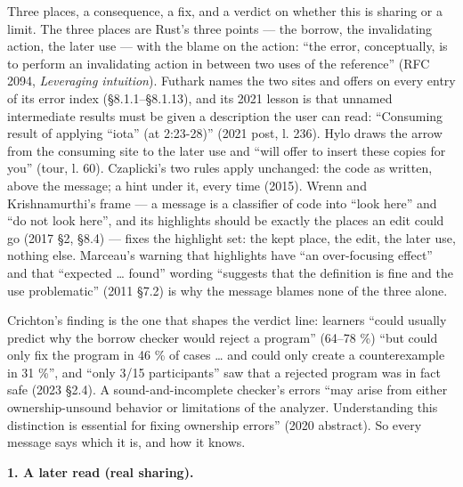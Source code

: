 

Three places, a consequence, a fix, and a verdict on whether this is sharing or a limit. The three places are Rust's three points — the borrow, the invalidating action, the later use — with the blame on the action: “the error, conceptually, is to perform an invalidating action in between two uses of the reference” (RFC 2094, \emph{Leveraging intuition}). Futhark names the two sites and offers  on every entry of its error index (§8.1.1–§8.1.13), and its 2021 lesson is that unnamed intermediate results must be given a description the user can read: “Consuming result of applying “iota” (at 2:23-28)” (2021 post, l. 236). Hylo draws the arrow from the consuming site to the later use and “will offer to insert these copies for you” (tour, l. 60). Czaplicki's two rules apply unchanged: the code as written, above the message; a hint under it, every time (2015). Wrenn and Krishnamurthi's frame — a message is a classifier of code into “look here” and “do not look here”, and its highlights should be exactly the places an edit could go (2017 §2, §8.4) — fixes the highlight set: the kept place, the edit, the later use, nothing else. Marceau's warning that highlights have “an over-focusing effect” and that “expected … found” wording “suggests that the definition is fine and the use problematic” (2011 §7.2) is why the message blames none of the three alone.

Crichton's finding is the one that shapes the verdict line: learners “could usually predict why the borrow checker would reject a program” (64–78 \%) “but could only fix the program in 46 \% of cases … and could only create a counterexample in 31 \%”, and “only 3/15 participants” saw that a rejected program was in fact safe (2023 §2.4). A sound-and-incomplete checker's errors “may arise from either ownership-unsound behavior or limitations of the analyzer. Understanding this distinction is essential for fixing ownership errors” (2020 abstract). So every message says which it is, and how it knows.


\textbf{1. A later read (real sharing).}

